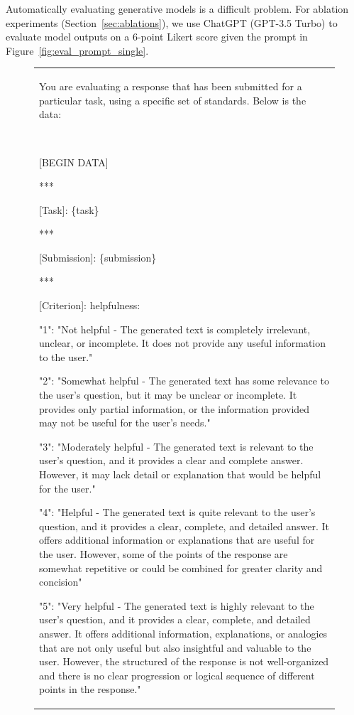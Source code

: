 Automatically evaluating generative models is a difficult problem.
For ablation experiments (Section~\ref{sec:ablations}), we use ChatGPT (GPT-3.5 Turbo) to evaluate model outputs on a 6-point Likert score given the prompt in Figure~\ref{fig:eval_prompt_single}.


\begin{figure}[t]
    \scriptsize
    \centering
\begin{tabular}{@{}p{\columnwidth}@{}}
\toprule
You are evaluating a response that has been submitted for a particular task, using a specific set of standards. Below is the data:

~

[BEGIN DATA]

***

[Task]: \{task\}

***

[Submission]: \{submission\}

***

[Criterion]: helpfulness:

"1": "Not helpful - The generated text is completely irrelevant, unclear, or incomplete. It does not provide any useful information to the user."

"2": "Somewhat helpful - The generated text has some relevance to the user's question, but it may be unclear or incomplete. It provides only partial information, or the information provided may not be useful for the user's needs."

"3": "Moderately helpful - The generated text is relevant to the user's question, and it provides a clear and complete answer. However, it may lack detail or explanation that would be helpful for the user."

"4": "Helpful - The generated text is quite relevant to the user's question, and it provides a clear, complete, and detailed answer. It offers additional information or explanations that are useful for the user. However, some of the points of the response are somewhat repetitive or could be combined for greater clarity and concision"

"5": "Very helpful - The generated text is highly relevant to the user's question, and it provides a clear, complete, and detailed answer. It offers additional information, explanations, or analogies that are not only useful but also insightful and valuable to the user. However, the structured of the response is not well-organized and there is no clear progression or logical sequence of different points in the response."


\end{tabular}
\end{figure}
